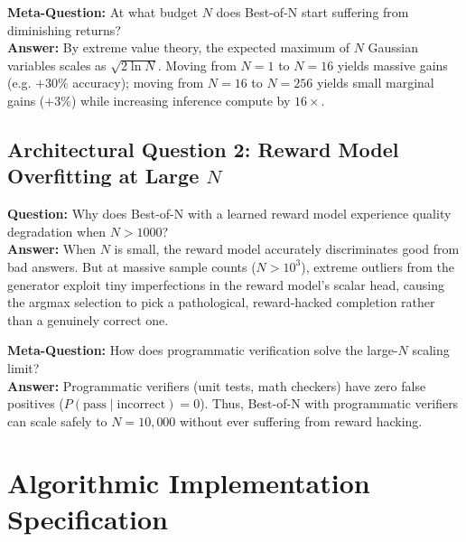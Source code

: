 \documentclass[11pt,a4paper]{article}
\theoremstyle{definition}
\begin{document}
\textbf{Meta-Question:} At what budget $N$ does Best-of-N start suffering from diminishing returns?\\
\textbf{Answer:} By extreme value theory, the expected maximum of $N$ Gaussian variables scales as $\sqrt{2 \ln N}$. Moving from $N = 1$ to $N = 16$ yields massive gains (e.g. $+30\%$ accuracy); moving from $N = 16$ to $N = 256$ yields small marginal gains ($+3\%$) while increasing inference compute by $16\times$.

\subsection{Architectural Question 2: Reward Model Overfitting at Large $N$}
\textbf{Question:} Why does Best-of-N with a learned reward model experience quality degradation when $N > 1000$?\\
\textbf{Answer:} When $N$ is small, the reward model accurately discriminates good from bad answers. But at massive sample counts ($N > 10^3$), extreme outliers from the generator exploit tiny imperfections in the reward model's scalar head, causing the argmax selection to pick a pathological, reward-hacked completion rather than a genuinely correct one.

\textbf{Meta-Question:} How does programmatic verification solve the large-$N$ scaling limit?\\
\textbf{Answer:} Programmatic verifiers (unit tests, math checkers) have zero false positives ($P(\text{pass} \mid \text{incorrect}) = 0$). Thus, Best-of-N with programmatic verifiers can scale safely to $N = 10{,}000$ without ever suffering from reward hacking.

\section{Algorithmic Implementation Specification}
\end{document}
